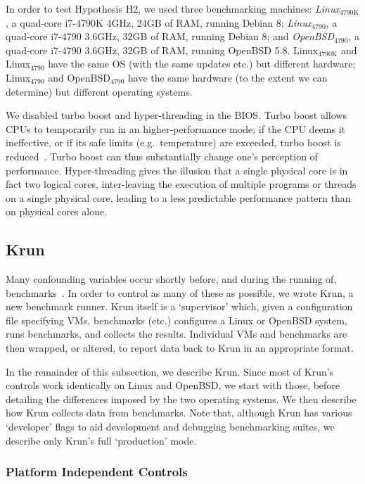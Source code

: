 \documentclass[preprint,numbers,10pt]{sigplanconf}
\newcommand{\krun}{Krun\xspace}
\newcommand{\bencherthree}{Linux$_\mathrm{4790K}$\xspace}
\newcommand{\bencherfive}{Linux$_\mathrm{4790}$\xspace}
\newcommand{\benchersix}{OpenBSD$_\mathrm{4790}$\xspace}
\begin{document}
In order to test Hypothesis H2, we used three benchmarking machines: \emph{\bencherthree}, a quad-core i7-4790K
4GHz, 24GB of RAM, running Debian 8; \emph{\bencherfive}, a quad-core i7-4790
3.6GHz, 32GB of RAM, running Debian 8; and \emph{\benchersix}, a quad-core i7-4790
3.6GHz, 32GB of RAM, running OpenBSD 5.8. \bencherthree and \bencherfive
have the same OS (with the same updates etc.) but different hardware; \bencherfive
and \benchersix have the same hardware (to the extent we can determine)
but different operating systems.

We disabled turbo boost and hyper-threading in the BIOS. Turbo boost
allows CPUs to temporarily run in an higher-performance
mode; if the CPU deems it ineffective, or if its safe limits (e.g.~temperature) are exceeded,
turbo boost is reduced~\cite{charles09turboboost}. Turbo boost
can thus substantially change one's
perception of performance. Hyper-threading gives the illusion that a single
physical core is in fact two logical cores, inter-leaving the
execution of multiple programs or threads on a single physical core,
leading to a less predictable performance pattern
than on physical cores alone.


\subsection{\krun}
\label{krun}

Many confounding variables occur shortly before, and during the running of,
benchmarks~\cite{kalibera05precision}. In order to control as many of these as possible, we wrote
\krun, a new benchmark runner. \krun itself is a `supervisor'
which, given a configuration file specifying VMs, benchmarks (etc.) configures
a Linux or OpenBSD system, runs benchmarks, and collects the results. Individual VMs and benchmarks
are then wrapped, or altered, to report data back to \krun in an appropriate format.

In the remainder of this subsection, we describe \krun. Since most of \krun's
controls work identically on Linux and OpenBSD, we start with those,
before detailing the differences imposed by the two operating systems. We then
describe how \krun collects data from benchmarks.
Note that, although \krun has various `developer' flags to aid development
and debugging benchmarking suites, we describe only \krun's full `production' mode.


\subsubsection{Platform Independent Controls}
\end{document}
